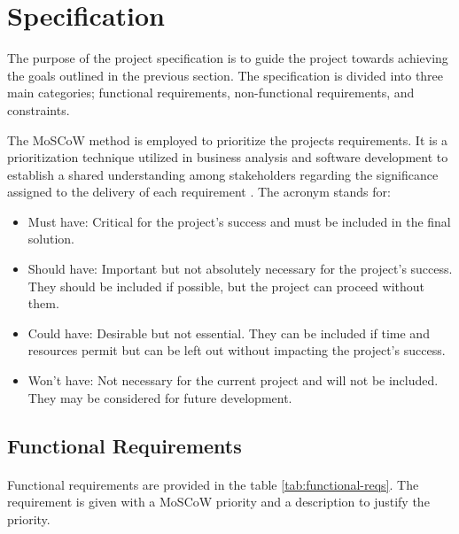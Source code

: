 \documentclass[12pt, conference, final, a4paper, onecolumn, compsoc]{IEEEtran}
\begin{document}

\section{Specification}

The purpose of the project specification is to guide the project towards
achieving the goals outlined in the previous section. The specification is
divided into three main categories; functional requirements, non-functional
requirements, and constraints.

The MoSCoW method is employed to prioritize the projects requirements. It is a
prioritization technique utilized in business analysis and software development
to establish a shared understanding among stakeholders regarding the
significance assigned to the delivery of each requirement
\citep{moscow-prioritization}. The acronym stands for:

\begin{itemize}
  \item Must have: Critical for the project's success and must be included in
        the final solution.
  \item Should have: Important but not absolutely necessary for the project's
        success. They should be included if possible, but the project can
        proceed without them.
  \item Could have: Desirable but not essential. They can be included if time
        and resources permit but can be left out without impacting the project's
        success.
  \item Won't have: Not necessary for the current project and will not be
        included. They may be considered for future development.
\end{itemize}

\subsection{Functional Requirements}
\paragraph{}

Functional requirements are provided in the table \ref{tab:functional-reqs}. The
requirement is given with a MoSCoW priority and a description to justify the
priority.
\end{document}
